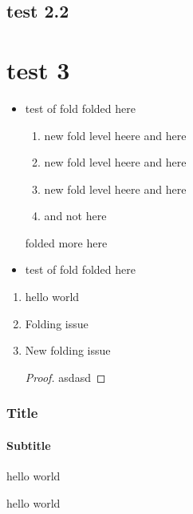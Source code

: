 \documentclass[%
  fontsize=12pt,
  headings=big,
  english,
  paper=a4,
  twoside,
  open=right,
  DIV=14,
  BCOR=20mm,
  headinclude=false,
  footinclude=false,
  mpinclude=false,
  pagesize,
  titlepage,
  parskip=half,
  headsepline,
  chapterprefix=false,
  appendixprefix=Appendix,
  appendixwithprefixline=true,
  bibliography=totoc,
  toc=graduated,
  numbers=noenddot,
]{scrbook}
\begin{document}
\subsection{test 2.2}

\section{test 3}

\begin{itemize}
  \item test of fold
    folded here
    \begin{enumerate}
      \item new fold level heere
        and here
      \item new fold level heere
        and here
      \item new fold level heere
        and here
      \item and not here
    \end{enumerate}
    folded more here
  \item test of fold
    folded here
\end{itemize}

\begin{enumerate}
  \item \begin{test}
      hello
      world
    \end{test}

  \item Folding issue

  \item New folding issue \begin{proof}
      asdasd
    \end{proof}
\end{enumerate}

\begin{frame}
  \frametitle{Title}
  \framesubtitle{Subtitle}

  hello world
\end{frame}

\begin{frame}[noframenumbering]  %
  hello world
\end{frame}
\end{document}
